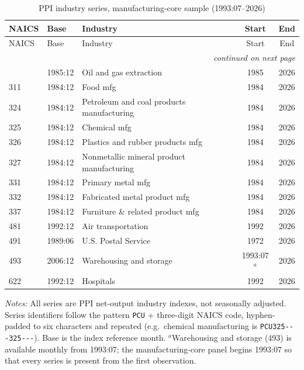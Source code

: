 {\footnotesize
\begin{longtable}{llp{5cm}cc}
\caption{PPI industry series, manufacturing-core sample (1993:07--2026)}\label{tab:core}\\
\toprule
NAICS & Base & Industry & Start & End \\
\midrule
\endfirsthead
\toprule
NAICS & Base & Industry & Start & End \\
\midrule
\endhead
\midrule\multicolumn{5}{r}{\textit{continued on next page}}\\
\endfoot
\bottomrule
\endlastfoot
211 & 1985:12 & Oil and gas extraction & 1985 & 2026 \\
311 & 1984:12 & Food mfg & 1984 & 2026 \\
324 & 1984:12 & Petroleum and coal products manufacturing & 1984 & 2026 \\
325 & 1984:12 & Chemical mfg & 1984 & 2026 \\
326 & 1984:12 & Plastics and rubber products mfg & 1984 & 2026 \\
327 & 1984:12 & Nonmetallic mineral product manufacturing & 1984 & 2026 \\
331 & 1984:12 & Primary metal mfg & 1984 & 2026 \\
332 & 1984:12 & Fabricated metal product mfg & 1984 & 2026 \\
337 & 1984:12 & Furniture \& related product mfg & 1984 & 2026 \\
481 & 1992:12 & Air transportation & 1992 & 2026 \\
491 & 1989:06 & U.S. Postal Service & 1972 & 2026 \\
493 & 2006:12 & Warehousing and storage & 1993:07$^{a}$ & 2026 \\
622 & 1992:12 & Hospitals & 1992 & 2026 \\
\end{longtable}
\par\vspace{-0.4em}\textit{Notes:}  All series are PPI net-output industry indexes, not seasonally adjusted. Series identifiers follow the pattern \texttt{PCU} + three-digit NAICS code, hyphen-padded to six characters and repeated (e.g.\ chemical manufacturing is \texttt{PCU325{-}{-}{-}325{-}{-}{-}}). Base is the index reference month. $^{a}$Warehousing and storage (493) is available monthly from 1993:07; the manufacturing-core panel begins 1993:07 so that every series is present from the first observation. 
}

